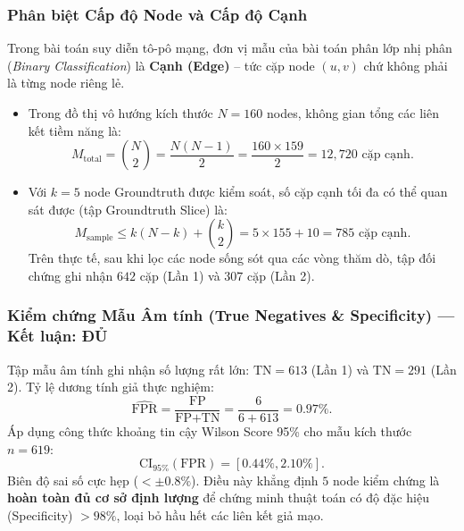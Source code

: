 \documentclass[11pt,a4paper]{article}
\begin{document}
\subsubsection{Phân biệt Cấp độ Node và Cấp độ Cạnh}
Trong bài toán suy diễn tô-pô mạng, đơn vị mẫu của bài toán phân lớp nhị phân (\textit{Binary Classification}) là \textbf{Cạnh (Edge)} -- tức cặp node $(u, v)$ chứ không phải là từng node riêng lẻ.
\begin{itemize}
    \item Trong đồ thị vô hướng kích thước $N = 160$ nodes, không gian tổng các liên kết tiềm năng là:
    \begin{equation}
        M_{\text{total}} = \binom{N}{2} = \frac{N(N-1)}{2} = \frac{160 \times 159}{2} = 12,720 \text{ cặp cạnh}.
    \end{equation}
    \item Với $k = 5$ node Groundtruth được kiểm soát, số cặp cạnh tối đa có thể quan sát được (tập Groundtruth Slice) là:
    \begin{equation}
        M_{\text{sample}} \le k(N - k) + \binom{k}{2} = 5 \times 155 + 10 = 785 \text{ cặp cạnh}.
    \end{equation}
    Trên thực tế, sau khi lọc các node sống sót qua các vòng thăm dò, tập đối chứng ghi nhận $642$ cặp (Lần 1) và $307$ cặp (Lần 2).
\end{itemize}

\subsubsection{Kiểm chứng Mẫu Âm tính (True Negatives \& Specificity) --- Kết luận: ĐỦ}
Tập mẫu âm tính ghi nhận số lượng rất lớn: $\text{TN} = 613$ (Lần 1) và $\text{TN} = 291$ (Lần 2).
Tỷ lệ dương tính giả thực nghiệm:
\begin{equation}
    \widehat{\text{FPR}} = \frac{\text{FP}}{\text{FP} + \text{TN}} = \frac{6}{6 + 613} = 0.97\%.
\end{equation}
Áp dụng công thức khoảng tin cậy Wilson Score 95\% cho mẫu kích thước $n = 619$:
\begin{equation}
    \text{CI}_{95\%}(\text{FPR}) = [0.44\%, 2.10\%].
\end{equation}
Biên độ sai số cực hẹp ($<\pm 0.8\%$). Điều này khẳng định $5$ node kiểm chứng là \textbf{hoàn toàn đủ cơ sở định lượng} để chứng minh thuật toán có độ đặc hiệu (Specificity) $> 98\%$, loại bỏ hầu hết các liên kết giả mạo.
\end{document}
